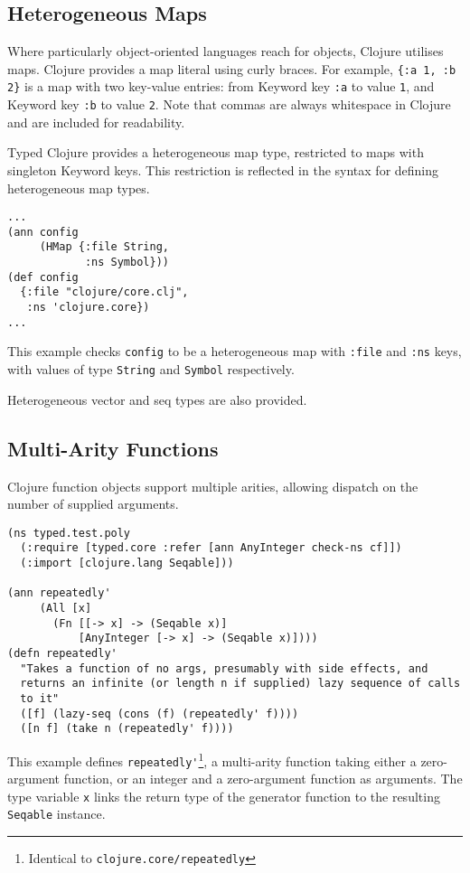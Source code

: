 \subsection{Heterogeneous Maps}

Where particularly object-oriented languages reach for objects, Clojure
utilises maps. Clojure provides a map literal using curly braces. For example,
\lstinline|{:a 1, :b 2}| is a map with two key-value entries: from Keyword key \lstinline|:a|
to value \lstinline|1|, and Keyword key \lstinline|:b| to value \lstinline|2|. Note that commas are always
whitespace in Clojure and are included for readability.

Typed Clojure provides a heterogeneous map type, restricted to 
maps with singleton Keyword keys. This restriction is reflected
in the syntax for defining heterogeneous map types.

\begin{lstlisting}
...
(ann config
     (HMap {:file String,
            :ns Symbol}))
(def config
  {:file "clojure/core.clj",
   :ns 'clojure.core})
...
\end{lstlisting}

This example checks \lstinline|config| to be a heterogeneous map
with \lstinline|:file| and \lstinline|:ns| keys, with values of
type \lstinline|String| and \lstinline|Symbol| respectively.

Heterogeneous vector and seq types are also provided.

\subsection{Multi-Arity Functions}

Clojure function objects support multiple arities, allowing dispatch
on the number of supplied arguments.

\begin{lstlisting}
(ns typed.test.poly
  (:require [typed.core :refer [ann AnyInteger check-ns cf]])
  (:import [clojure.lang Seqable]))

(ann repeatedly'
     (All [x]
       (Fn [[-> x] -> (Seqable x)]
           [AnyInteger [-> x] -> (Seqable x)])))
(defn repeatedly'
  "Takes a function of no args, presumably with side effects, and
  returns an infinite (or length n if supplied) lazy sequence of calls
  to it"
  ([f] (lazy-seq (cons (f) (repeatedly' f))))
  ([n f] (take n (repeatedly' f))))
\end{lstlisting}

This example defines \lstinline|repeatedly'|\footnote{Identical to \lstinline|clojure.core/repeatedly|},
a multi-arity function taking either a zero-argument function, or an integer and a zero-argument function as arguments.
The type variable \lstinline|x| links the return type of the generator function to
the resulting \lstinline|Seqable| instance.

